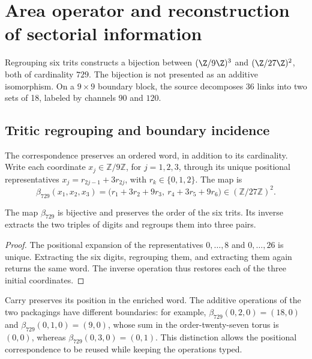 \section{Area operator and reconstruction of sectorial information}
\label{v:ant:sec:area}
Regrouping six trits constructs a bijection between
$(\Z/9\Z)^3$ and $(\Z/27\Z)^2$, both of cardinality $729$.
The bijection is not presented as an additive isomorphism. On a
$9\times9$ boundary block, the source decomposes 36 links into two
sets of 18, labeled by channels $90$ and $120$.

\subsection{Tritic regrouping and boundary incidence}
\label{v:ant:sec:ii-area-incidencia-explicita}

The correspondence preserves an ordered word, in addition to its cardinality.
Write each coordinate \(x_j\in\mathbb Z/9\mathbb Z\), for
\(j=1,2,3\), through its unique positional representatives
\(x_j=r_{2j-1}+3r_{2j}\), with \(r_k\in\{0,1,2\}\). The map is
\begin{equation}
 \beta_{729}(x_1,x_2,x_3)
 =\bigl(r_1+3r_2+9r_3,\ r_4+3r_5+9r_6\bigr)
 \in(\mathbb Z/27\mathbb Z)^2.
 \label{v:ant:eq:ii-area-beta729}
\end{equation}

\begin{proposition}
\label{v:ant:prop:ii-area-beta729}
The map \(\beta_{729}\) is bijective and preserves the order of the
six trits. Its inverse extracts the two triples of digits and regroups them
into three pairs.
\end{proposition}
\begin{proof}
The positional expansion of the representatives \(0,\ldots,8\) and
\(0,\ldots,26\) is unique. Extracting the six digits, regrouping them, and
extracting them again returns the same word. The inverse operation
thus restores each of the three initial coordinates.
\end{proof}

Carry preserves its position in the enriched word. The additive
operations of the two packagings have different boundaries: for example,
\(\beta_{729}(0,2,0)=(18,0)\) and
\(\beta_{729}(0,1,0)=(9,0)\), whose sum in the order-twenty-seven
torus is \((0,0)\), whereas
\(\beta_{729}(0,3,0)=(0,1)\). This distinction allows the positional
correspondence to be reused while keeping the operations typed.

